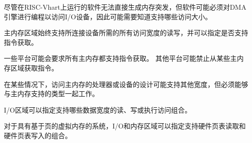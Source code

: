 {\iffalse
\begin{commentary}
Although software running on a RISC-V hart cannot directly generate
bursts to memory, software might have to program DMA engines to access
I/O devices and might therefore need to know which access sizes are
supported.
\end{commentary}
\fi
\begin{commentary}
尽管在RISC-Vhart上运行的软件无法直接生成内存突发，但软件可能必须对DMA引擎进行编程以访问I/O设备，因此可能需要知道支持哪些访问大小。
\end{commentary}

\iffalse
Main memory regions always support read and write of all
access widths required by the attached devices, and can
specify whether instruction fetch is supported.
\fi
主内存区域始终支持所连接设备所需的所有访问宽度的读写，并可以指定是否支持指令获取。

\iffalse
\begin{commentary}
Some platforms might mandate that all of main memory support instruction
fetch.
Other platforms might prohibit instruction fetch from some main memory
regions.
\end{commentary}
\fi
\begin{commentary}
一些平台可能会要求所有主内存都支持指令获取。
其他平台可能禁止从某些主内存区域获取指令。
\end{commentary}

\iffalse
\begin{commentary}
In some cases, the design of a processor or device accessing main
memory might support other widths, but must be able to function with
the types supported by the main memory.
\end{commentary}
\fi
\begin{commentary}
在某些情况下，访问主内存的处理器或设备的设计可能支持其他宽度，但必须能够与主内存支持的类型一起工作。
\end{commentary}

\iffalse
I/O regions can specify which combinations of read, write, or execute
accesses to which data widths are supported.

For systems with page-based virtual memory, I/O and memory regions can
specify which combinations of hardware page-table reads and hardware
page-table writes are supported.
\fi
I/O区域可以指定支持哪些数据宽度的读、写或执行访问组合。

对于具有基于页的虚拟内存的系统，I/O和内存区域可以指定支持硬件页表读取和硬件页表写入的组合。

}
